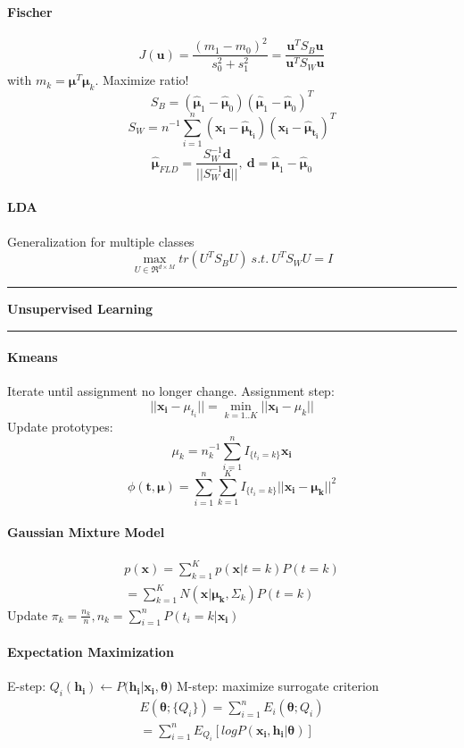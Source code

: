 \documentclass[7pt]{scrartcl}
\newlength{\secskip}
\renewcommand{\section}[1]{
  \vspace{\secskip}
  \hrule\vspace{.3em}
  \textbf{#1}
  \vspace{.3em}
  \hrule
  \vspace{\secskip}
}
\renewcommand{\vec}{\mathbf}
\begin{document}
\begin{multicols}{4}
\paragraph{Fischer}
\[J(\vec{u}) = \frac{(m_1 - m_0)^2}{s_0^2 + s_1^2} = \frac{\vec{u}^T S_B \vec{u}}{\vec{u}^T S_W \vec{u}}\]
with $m_k = \vec{\mu}^T \vec{\mu}_k$. Maximize ratio!
\[S_B = (\hat{\vec{\mu}}_1 -\hat{\vec{\mu}}_0)(\hat{\vec{\mu}}_1 -\hat{\vec{\mu}}_0)^T\]
\[S_W = n^{-1} \sum_{i=1}^n(\vec{x_i} - \vec{\hat{\mu}_{t_i}})(\vec{x_i} - \vec{\hat{\mu}_{t_i}})^T\]
\[\vec{\hat{\mu}}_{FLD} = \frac{S_W^{-1} \vec{d}}{||S_W^{-1} \vec{d}||}, ~ \vec{d} = \hat{\vec{\mu}}_1 -\hat{\vec{\mu}}_0\]
\paragraph{LDA}
Generalization for multiple classes
\[\max_{U \in \Re^{d \times M}} tr(U^T S_B U) ~s.t.~ U^T S_WU = I\]

\section{Unsupervised Learning}
\paragraph{Kmeans}
Iterate until assignment no longer change. Assignment step: \\
\[||\vec{x_i} - \mu_{t_i}|| = \min_{k=1..K} || \vec{x_i} - \mu_{k}||\]
Update prototypes: \\
\[\mu_k = n_k^{-1} \sum_{i=1}^n I_{\{t_i=k\}}\vec{x_i}\]
\[\phi(\vec{t,\mu}) = \sum_{i=1}^n\sum_{k=1}^K I_{\{t_i=k\}} || \vec{x_i} - \vec{\mu_k} || ^2\]
\paragraph{Gaussian Mixture Model}
\begin{align*}
p(\vec{x}) = \sum_{k=1}^K p(\vec{x}|t=k) P(t=k) \\
=  \sum_{k=1}^K N(\vec{x}|\vec{\mu_k},\Sigma_k)P(t=k)
\end{align*}
Update $\pi_k = \frac{n_k}{n}, n_k = \sum_{i=1}^nP(t_i=k|\vec{x_i})$

\paragraph{Expectation Maximization}
E-step: $Q_i(\vec{h_i}) \leftarrow P(\vec{h_i}|\vec{x_i},\vec{\theta)}$
M-step: maximize surrogate criterion
\begin{align*}
E(\vec{\theta};\{Q_i\}) = \sum_{i=1}^n E_i(\vec{\theta};Q_i) \\= \sum_{i=1}^n E_{Q_i} [logP(\vec{x_i},\vec{h_i}|\vec{\theta})]
\end{align*}


\end{multicols}
\end{document}
